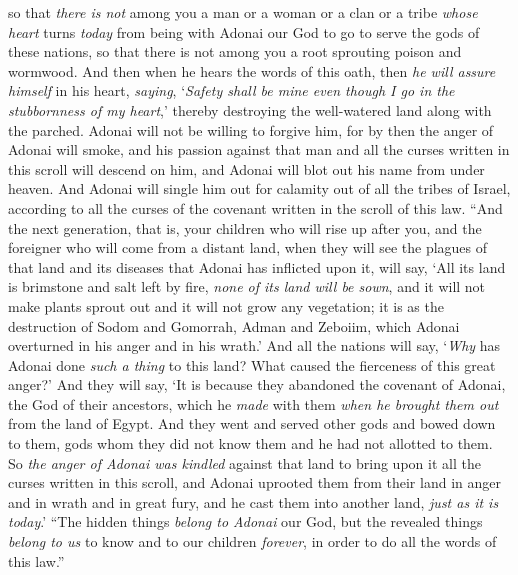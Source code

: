 \begin{biblechapter}
\verse so that \textit{there is not} among you a man or a woman or a clan or a tribe \textit{whose heart} turns \textit{today} from being with Adonai our God to go to serve the gods of these nations, so that there is not among you a root sprouting poison and wormwood.
\verse And then when he hears the words of this oath, then \textit{he will assure himself} in his heart, \textit{saying}, ‘\textit{Safety shall be mine even though I go in the stubbornness of my heart},’ thereby destroying the well-watered land along with the parched.
\verse Adonai will not be willing to forgive him, for by then the anger of Adonai will smoke, and his passion against that man and all the curses written in this scroll will descend on him, and Adonai will blot out his name from under heaven.
\verse And Adonai will single him out for calamity out of all the tribes of Israel, according to all the curses of the covenant written in the scroll of this law.
\verse “And the next generation, that is, your children who will rise up after you, and the foreigner who will come from a distant land, when they will see the plagues of that land and its diseases that Adonai has inflicted upon it, will say,
\verse ‘All its land is brimstone and salt left by fire, \textit{none of its land will be sown}, and it will not make plants sprout out and it will not grow any vegetation; it is as the destruction of Sodom and Gomorrah, Adman and Zeboiim, which Adonai overturned in his anger and in his wrath.’
\verse And all the nations will say, ‘\textit{Why} has Adonai done \textit{such a thing} to this land? What caused the fierceness of this great anger?’
\verse And they will say, ‘It is because they abandoned the covenant of Adonai, the God of their ancestors, which he \textit{made} with them \textit{when he brought them out} from the land of Egypt.
\verse And they went and served other gods and bowed down to them, gods whom they did not know them and he had not allotted to them.
\verse So \textit{the anger of Adonai was kindled} against that land to bring upon it all the curses written in this scroll,
\verse and Adonai uprooted them from their land in anger and in wrath and in great fury, and he cast them into another land, \textit{just as it is today}.’
\verse “The hidden things \textit{belong to Adonai} our God, but the revealed things \textit{belong to us} to know and to our children \textit{forever}, in order to do all the words of this law.”
\end{biblechapter}

